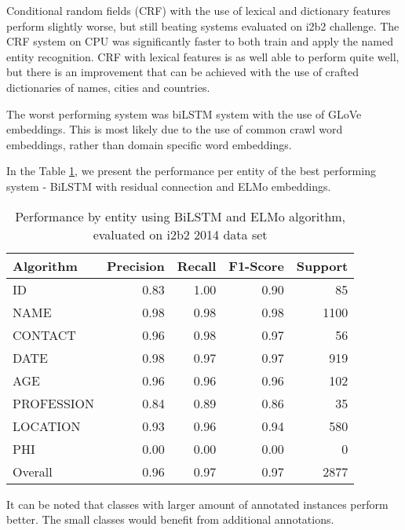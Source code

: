 \documentclass[a4paper,twoside]{article}
\begin{document}
Conditional random fields (CRF) with the use of lexical and dictionary features perform slightly worse, but still beating systems evaluated on i2b2 challenge. The CRF system on CPU was significantly faster to both train and apply the named entity recognition. CRF with lexical features is as well able to perform quite well,  but there is an improvement that can be achieved with the use of crafted dictionaries of names, cities and countries. 

The worst performing system was biLSTM system with the use of GLoVe embeddings. This is most likely due to the use of common crawl word embeddings, rather than domain specific word embeddings. 

In the Table \ref{table:perfELMo}, we present the performance per entity of the best performing system - BiLSTM with residual connection and ELMo embeddings. 


\begin{table}[htbp]
\centering
\begin{tabular}{ lrrrr }
  \hline
   \small{\textbf{Algorithm}} & \small{\textbf{Precision}} & \small{\textbf{Recall}} & \small{\textbf{F1-Score}}& \small{\textbf{Support}}\\ \hline
  \small{ID} & \small{0.83} & \small{1.00} & \small{0.90} & \small{85} \\
   \small{NAME} & \small{0.98} & \small{0.98} & \small{0.98} & \small{1100} \\
   \small{CONTACT} & \small{0.96} & \small{0.98} & \small{0.97}  & \small{56} \\
 \small{DATE} & \small{0.98} & \small{0.97} & \small{0.97}  & \small{919}\\
\small{AGE} & \small{0.96} & \small{0.96} & \small{0.96}  & \small{102}\\
\small{PROFESSION} & \small{0.84} & \small{0.89} & \small{0.86}  & \small{35}\\
\small{LOCATION} & \small{0.93} & \small{0.96} & \small{0.94}  & \small{580}\\
\small{PHI} & \small{0.00} & \small{0.00} & \small{0.00}  & \small{0}\\
\hline
\small{Overall} & \small{0.96} & \small{0.97} & \small{0.97}  & \small{2877}\\
\hline
\end{tabular} 
\caption{Performance by entity using BiLSTM and ELMo algorithm, evaluated on i2b2 2014 data set}
\label{table:perfELMo}
\end{table}

It can be noted that classes with larger amount of annotated instances perform better. The small classes would benefit from additional annotations. 
\end{document}
